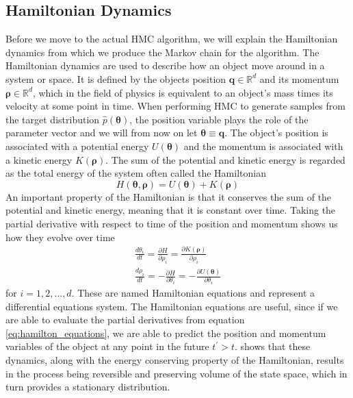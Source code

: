 \subsection{Hamiltonian Dynamics}
Before we move to the actual HMC algorithm, we will explain the Hamiltonian dynamics from which we produce the Markov chain for the algorithm. The Hamiltonian dynamics are used to describe how an object move around in a system or space. It is defined by the objects position $\boldsymbol{q}\in \mathbb{R}^d$ and its momentum $\boldsymbol{\rho}\in \mathbb{R}^d$, which in the field of physics is equivalent to an object's mass times its velocity at some point in time. When performing HMC to generate samples from the target distribution $\hat{p}(\boldsymbol{\theta})$, the position variable plays the role of the parameter vector and we will from now on let $\boldsymbol{\theta}\equiv \boldsymbol{q}$. The object's position is associated with a potential energy $U(\boldsymbol{\theta})$ and  the momentum is associated with a kinetic energy $K(\boldsymbol{\rho})$. The sum of the potential and kinetic energy is regarded as the total energy of the system often called the Hamiltonian
\begin{equation*}
H(\boldsymbol{\theta},\boldsymbol{\rho})=U(\boldsymbol{\theta})+K(\boldsymbol{\rho})    
\end{equation*}       
An important property of the Hamiltonian is that it conserves the sum of the potential and kinetic energy, meaning that it is constant over time. Taking the partial derivative with respect to time of the position and momentum shows us how they evolve over time
\begin{equation}\label{eq:hamilton_equations}
\begin{split}
\frac{d \theta_{i}}{d t}=\frac{\partial H}{\partial \rho_{i}}=\frac{\partial K(\boldsymbol{\rho})}{\partial \rho_{i}} \\
\frac{d \rho_{i}}{d t}=-\frac{\partial H}{\partial \theta_{i}}=-\frac{\partial U(\boldsymbol{\theta})}{\partial \theta_{i}}
\end{split}
\end{equation}
for $i=1,2, \ldots,d$. These are named Hamiltonian equations and represent a differential equations system. The Hamiltonian equations are useful, since if we are able to evaluate the partial derivatives from equation \ref{eq:hamilton_equations}, we are able to predict the position and momentum variables of the object at any point in the future $t^\prime>t$. \cite{neal2012bayesian} shows that these dynamics, along with the energy conserving property of the Hamiltonian, results in the process being reversible and preserving volume of the state space, which in turn provides a stationary distribution. 


